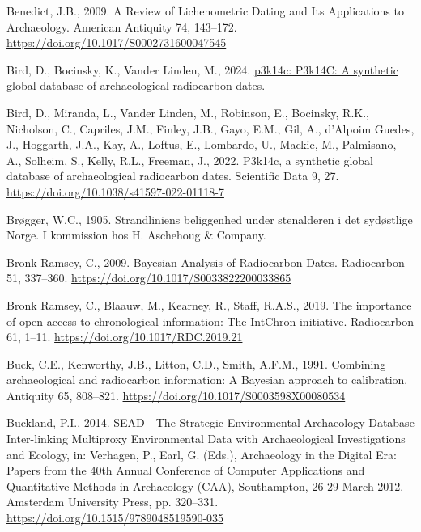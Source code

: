 \documentclass[
  number,
  doubleblind]{elsarticle}
\newlength{\cslhangindent}
\newenvironment{CSLReferences}[2] %
 {\begin{list}{}{%
  \setlength{\itemindent}{0pt}
  \setlength{\leftmargin}{0pt}
  \setlength{\parsep}{0pt}
  \ifodd #1
   \setlength{\leftmargin}{\cslhangindent}
   \setlength{\itemindent}{-1\cslhangindent}
  \fi
  \setlength{\itemsep}{#2\baselineskip}}}
 {\end{list}}
\begin{document}
\begin{CSLReferences}{1}{0}
Benedict, J.B., 2009. A {Review} of {Lichenometric Dating} and {Its
Applications} to {Archaeology}. American Antiquity 74, 143--172.
\url{https://doi.org/10.1017/S0002731600047545}

Bird, D., Bocinsky, K., Vander Linden, M., 2024.
\href{https://github.com/people3k/p3k14c}{p3k14c: P3k14C: A synthetic
global database of archaeological radiocarbon dates}.

Bird, D., Miranda, L., Vander Linden, M., Robinson, E., Bocinsky, R.K.,
Nicholson, C., Capriles, J.M., Finley, J.B., Gayo, E.M., Gil, A.,
d'Alpoim Guedes, J., Hoggarth, J.A., Kay, A., Loftus, E., Lombardo, U.,
Mackie, M., Palmisano, A., Solheim, S., Kelly, R.L., Freeman, J., 2022.
P3k14c, a synthetic global database of archaeological radiocarbon dates.
Scientific Data 9, 27. \url{https://doi.org/10.1038/s41597-022-01118-7}

Brøgger, W.C., 1905. Strandliniens beliggenhed under stenalderen i det
sydøstlige Norge. I kommission hos H. Aschehoug \& Company.

Bronk Ramsey, C., 2009. Bayesian {Analysis} of {Radiocarbon Dates}.
Radiocarbon 51, 337--360.
\url{https://doi.org/10.1017/S0033822200033865}

Bronk Ramsey, C., Blaauw, M., Kearney, R., Staff, R.A.S., 2019. The
importance of open access to chronological information: The {IntChron}
initiative. Radiocarbon 61, 1--11.
\url{https://doi.org/10.1017/RDC.2019.21}

Buck, C.E., Kenworthy, J.B., Litton, C.D., Smith, A.F.M., 1991.
Combining archaeological and radiocarbon information: A {Bayesian}
approach to calibration. Antiquity 65, 808--821.
\url{https://doi.org/10.1017/S0003598X00080534}

Buckland, P.I., 2014. {SEAD} - {The Strategic Environmental Archaeology
Database Inter-linking Multiproxy Environmental Data} with
{Archaeological Investigations} and {Ecology}, in: Verhagen, P., Earl,
G. (Eds.), Archaeology in the {Digital Era}: {Papers} from the 40th
{Annual Conference} of {Computer Applications} and {Quantitative
Methods} in {Archaeology} ({CAA}), {Southampton}, 26-29 {March} 2012.
Amsterdam University Press, pp. 320--331.
\url{https://doi.org/10.1515/9789048519590-035}


\end{CSLReferences}
\end{document}
